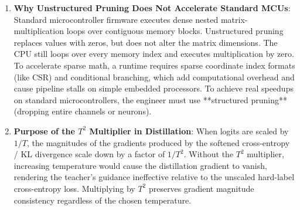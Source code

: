 \begin{enumerate}
    \item \textbf{Why Unstructured Pruning Does Not Accelerate Standard MCUs}:
    Standard microcontroller firmware executes dense nested matrix-multiplication loops over contiguous memory blocks. Unstructured pruning replaces values with zeros, but does not alter the matrix dimensions. The CPU still loops over every memory index and executes multiplication by zero. To accelerate sparse math, a runtime requires sparse coordinate index formats (like CSR) and conditional branching, which add computational overhead and cause pipeline stalls on simple embedded processors. To achieve real speedups on standard microcontrollers, the engineer must use **structured pruning** (dropping entire channels or neurons).

    \item \textbf{Purpose of the $T^2$ Multiplier in Distillation}:
    When logits are scaled by $1/T$, the magnitudes of the gradients produced by the softened cross-entropy / KL divergence scale down by a factor of $1/T^2$. Without the $T^2$ multiplier, increasing temperature would cause the distillation gradient to vanish, rendering the teacher's guidance ineffective relative to the unscaled hard-label cross-entropy loss. Multiplying by $T^2$ preserves gradient magnitude consistency regardless of the chosen temperature.
\end{enumerate}
